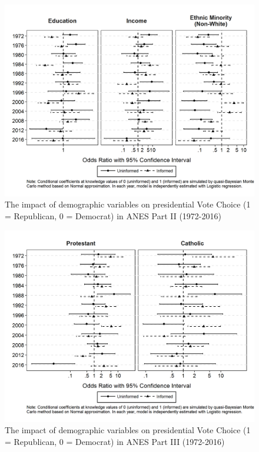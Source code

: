 \begin{figure}[ht!!!]
    \caption{The impact of demographic variables on presidential Vote Choice (1 = Republican, 0 = Democrat) in ANES Part II (1972-2016)}
    \label{fig:anescoefplot_dem2}
    \includegraphics[width=\linewidth]{../outputs/m1sq_anescoefplot_dem2.png}
\end{figure}

\begin{figure}[ht!!!]
    \caption{The impact of demographic variables on presidential Vote Choice (1 = Republican, 0 = Democrat) in ANES Part III (1972-2016)}
    \label{fig:anescoefplot_dem3}
    \includegraphics[width=\linewidth]{../outputs/m1sq_anescoefplot_dem3.png}
\end{figure}

